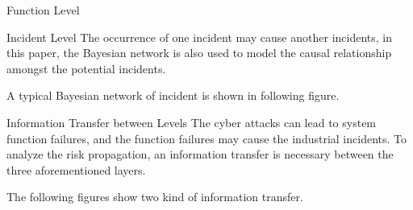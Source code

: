 \begin{frame}{Function Level}
    \begin{overlayarea}{\textwidth}{6cm}
    \begin{center}
      
    \end{center}
    \end{overlayarea}
\end{frame}

\begin{frame}{Incident Level}
    The occurrence of one incident may cause another incidents, in this paper, the Bayesian network is also used to model the causal relationship amongst the potential incidents.
    
    A typical Bayesian network of incident is shown in following figure.
    
    \begin{center}
      
    \end{center}
\end{frame}

\begin{frame}{Information Transfer between Levels}
    The cyber attacks can lead to system function failures, and the function failures may cause the industrial incidents. To analyze the risk propagation, an information transfer is necessary between the three aforementioned layers.
    
    The following figures show two kind of information transfer.        

    \begin{center}
    \end{center}
\end{frame}

